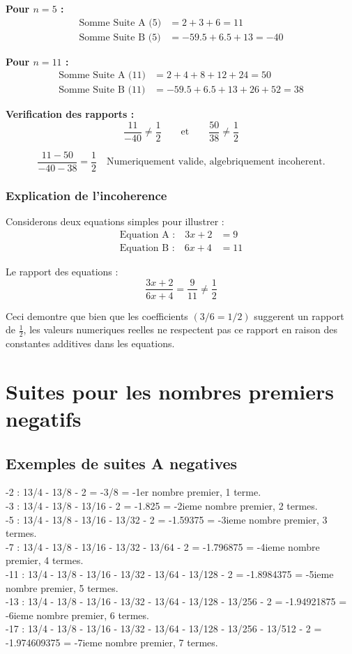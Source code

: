 \documentclass[a4paper,11pt]{article}
\begin{document}
\textbf{Pour $n = 5$ :}
\begin{align}
\text{Somme Suite A (5)} &= 2 + 3 + 6 = 11 \\
\text{Somme Suite B (5)} &= -59.5 + 6.5 + 13 = -40
\end{align}

\textbf{Pour $n = 11$ :}
\begin{align}
\text{Somme Suite A (11)} &= 2 + 4 + 8 + 12 + 24 = 50 \\
\text{Somme Suite B (11)} &= -59.5 + 6.5 + 13 + 26 + 52 = 38
\end{align}

\textbf{Verification des rapports :}
\[
\frac{11}{-40} \neq \frac{1}{2}
\qquad\text{et}\qquad
\frac{50}{38} \neq \frac{1}{2}
\]

\[
\frac{11 - 50}{-40 - 38} = \frac{1}{2}
\quad\text{Numeriquement valide, algebriquement incoherent.}
\]

\subsubsection{Explication de l'incoherence}

Considerons deux equations simples pour illustrer :
\begin{align}
\text{Equation A :} \quad 3x + 2 &= 9 \\
\text{Equation B :} \quad 6x + 4 &= 11
\end{align}

Le rapport des equations :
\[
\frac{3x + 2}{6x + 4} = \frac{9}{11} \neq \frac{1}{2}
\]

Ceci demontre que bien que les coefficients $(3/6 = 1/2)$ suggerent un rapport de $\frac{1}{2}$, les valeurs numeriques reelles ne respectent pas ce rapport en raison des constantes additives dans les equations.

\section*{Suites pour les nombres premiers negatifs}

\subsection*{Exemples de suites A negatives}

-2 : 13/4 - 13/8 - 2 = -3/8 = -1er nombre premier, 1 terme.\\
-3 : 13/4 - 13/8 - 13/16 - 2 = -1.825 = -2ieme nombre premier, 2 termes.\\
-5 : 13/4 - 13/8 - 13/16 - 13/32 - 2 = -1.59375 = -3ieme nombre premier, 3 termes.\\
-7 : 13/4 - 13/8 - 13/16 - 13/32 - 13/64 - 2 = -1.796875 = -4ieme nombre premier, 4 termes.\\
-11 : 13/4 - 13/8 - 13/16 - 13/32 - 13/64 - 13/128 - 2 = -1.8984375 = -5ieme nombre premier, 5 termes.\\
-13 : 13/4 - 13/8 - 13/16 - 13/32 - 13/64 - 13/128 - 13/256 - 2 = -1.94921875 = -6ieme nombre premier, 6 termes.\\
-17 : 13/4 - 13/8 - 13/16 - 13/32 - 13/64 - 13/128 - 13/256 - 13/512 - 2 = -1.974609375 = -7ieme nombre premier, 7 termes.\\
\end{document}
